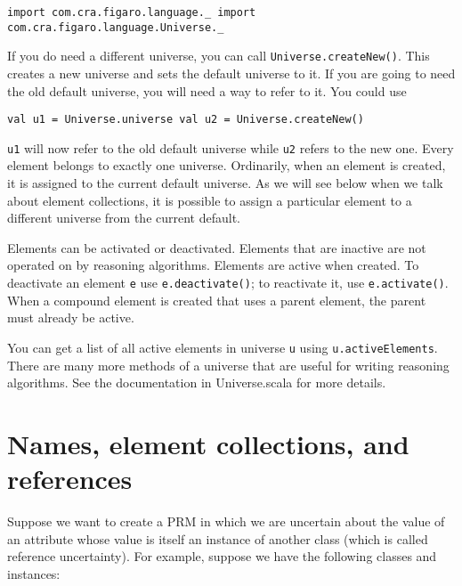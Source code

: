 \begin{flushleft}
\texttt{import com.cra.figaro.language.\_
\newline import com.cra.figaro.language.Universe.\_}
\end{flushleft}

If you do need a different universe, you can call \texttt{Universe.create\-New()}. This creates a new universe and sets the default universe to it. If you are going to need the old default universe, you will need a way to refer to it. You could use

\begin{flushleft}
\texttt{val u1 = Universe.universe
\newline val u2 = Universe.createNew()}
\end{flushleft}

\texttt{u1} will now refer to the old default universe while \texttt{u2} refers to the new one. Every element belongs to exactly one universe. Ordinarily, when an element is created, it is assigned to the current default universe. As we will see below when we talk about element collections, it is possible to assign a particular element to a different universe from the current default.

Elements can be activated or deactivated. Elements that are inactive are not operated on by reasoning algorithms. Elements are active when created. To deactivate an element \texttt{e} use \texttt{e.deactivate()}; to reactivate it, use \texttt{e.activate()}. When a compound element is created that uses a parent element, the parent must already be active.

You can get a list of all active elements in universe \texttt{u} using \texttt{u.active\-Elements}. There are many more methods of a universe that are useful for writing reasoning algorithms. See the documentation in Universe.scala for more details.

\section{Names, element collections, and references}

Suppose we want to create a PRM in which we are uncertain about the value of an attribute whose value is itself an instance of another class (which is called reference uncertainty). For example, suppose we have the following classes and instances:

